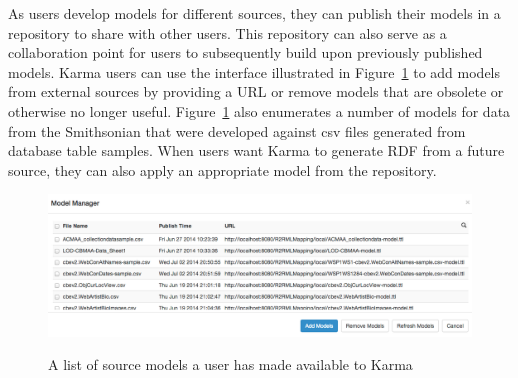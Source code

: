 As users develop models for different sources, they can publish their models in a repository to share with other users.  
This repository can also serve as a collaboration point for users to subsequently build upon previously published models.  
Karma users can use the interface illustrated in Figure~\ref{fig:model-manager-screenshot} to add models from external sources by providing a URL or remove models that are obsolete or otherwise no longer useful.  
Figure~\ref{fig:model-manager-screenshot} also enumerates a number of models for data from the Smithsonian that were developed against csv files generated from database table samples.  
When users want Karma to generate RDF from a future source, they can also apply an appropriate model from the repository.

\begin{figure}
\begin{center}
\includegraphics[width=4.8in]{images/3-model-manager.png}
\vspace{-3mm}
\caption{A list of source models a user has made available to Karma}
\vspace{-2mm}
\label{fig:model-manager-screenshot}
\end{center}
\vspace{-1.5em}
\end{figure}

